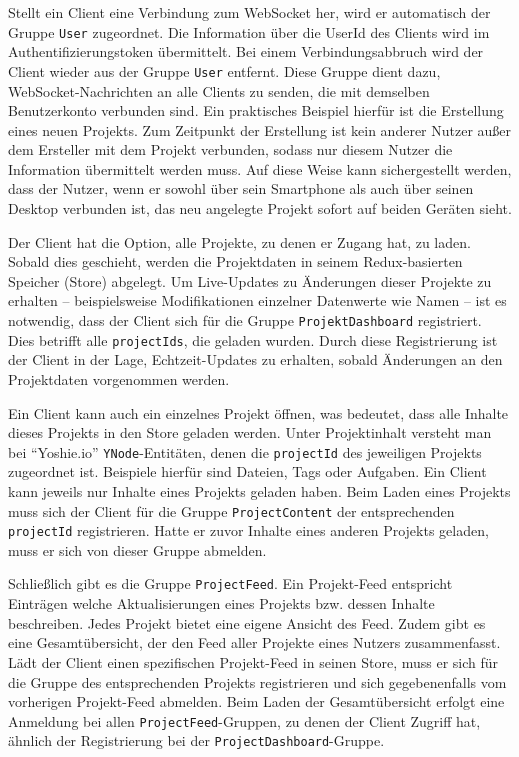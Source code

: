 \documentclass[12pt]{book}          %
\begin{document}
Stellt ein Client eine Verbindung zum WebSocket her, wird er automatisch der Gruppe \texttt{User} zugeordnet. Die Information über die UserId des Clients wird im Authentifizierungstoken übermittelt. Bei einem Verbindungsabbruch wird der Client wieder aus der Gruppe \texttt{User} entfernt. Diese Gruppe dient dazu, WebSocket-Nachrichten an alle Clients zu senden, die mit demselben Benutzerkonto verbunden sind. Ein praktisches Beispiel hierfür ist die Erstellung eines neuen Projekts. Zum Zeitpunkt der Erstellung ist kein anderer Nutzer außer dem Ersteller mit dem Projekt verbunden, sodass nur diesem Nutzer die Information übermittelt werden muss. Auf diese Weise kann sichergestellt werden, dass der Nutzer, wenn er sowohl über sein Smartphone als auch über seinen Desktop verbunden ist, das neu angelegte Projekt sofort auf beiden Geräten sieht.

Der Client hat die Option, alle Projekte, zu denen er Zugang hat, zu laden. Sobald dies geschieht, werden die Projektdaten in seinem Redux-basierten Speicher (Store) abgelegt. Um Live-Updates zu Änderungen dieser Projekte zu erhalten – beispielsweise Modifikationen einzelner Datenwerte wie Namen – ist es notwendig, dass der Client sich für die Gruppe \texttt{ProjektDashboard} registriert. Dies betrifft alle \texttt{projectIds}, die geladen wurden. Durch diese Registrierung ist der Client in der Lage, Echtzeit-Updates zu erhalten, sobald Änderungen an den Projektdaten vorgenommen werden.

Ein Client kann auch ein einzelnes Projekt öffnen, was bedeutet, dass alle Inhalte dieses Projekts in den Store geladen werden. Unter Projektinhalt versteht man bei "`Yoshie.io"' \texttt{YNode}-Entitäten, denen die \texttt{projectId} des jeweiligen Projekts zugeordnet ist. Beispiele hierfür sind Dateien, Tags oder Aufgaben. Ein Client kann jeweils nur Inhalte eines Projekts geladen haben. Beim Laden eines Projekts muss sich der Client für die Gruppe \texttt{ProjectContent} der entsprechenden \texttt{projectId} registrieren. Hatte er zuvor Inhalte eines anderen Projekts geladen, muss er sich von dieser Gruppe abmelden.

Schließlich gibt es die Gruppe \texttt{ProjectFeed}. Ein Projekt-Feed entspricht Einträgen welche Aktualisierungen eines Projekts bzw. dessen Inhalte beschreiben. Jedes Projekt bietet eine eigene Ansicht des Feed. Zudem gibt es eine Gesamtübersicht, der den Feed aller Projekte eines Nutzers zusammenfasst. Lädt der Client einen spezifischen Projekt-Feed in seinen Store, muss er sich für die Gruppe des entsprechenden Projekts registrieren und sich gegebenenfalls vom vorherigen Projekt-Feed abmelden. Beim Laden der Gesamtübersicht erfolgt eine Anmeldung bei allen  \texttt{ProjectFeed}-Gruppen, zu denen der Client Zugriff hat, ähnlich der Registrierung bei der \texttt{ProjectDashboard}-Gruppe.
\end{document}
